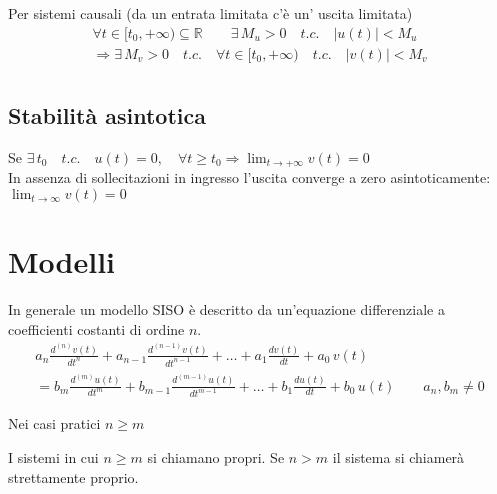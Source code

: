 	Per sistemi causali (da un entrata limitata c'è un' uscita limitata)
	\[
	\begin{split}
		\forall t \in [t_0, + \infty) \subseteq \mathbb{R} \qquad \exists \, M_u >0 \quad t.c. \quad \lvert u(t) \rvert < M_u \\
		\Rightarrow \exists \, M_v > 0 \quad t.c. \quad \forall t \in [t_0, + \infty) \quad t.c. \quad \lvert v(t) \rvert < M_v\\
	\end{split}		
	\]
	
\subsection{Stabilità asintotica}
	Se $\exists \, t_0 \quad t.c. \quad u(t)=0, \quad \forall t \ge t_0 \Rightarrow \lim_{t \to +\infty} v(t)=0$\\
	In assenza di sollecitazioni in ingresso l'uscita converge a zero asintoticamente: $\lim_{t \to \infty} v(t)=0$
	


	
\section{Modelli}

In generale un modello SISO è descritto da un'equazione differenziale a coefficienti costanti di ordine $n$.
\begin{multline}
	a_n \frac{d^{(n)} v(t)}{dt^n} 
		+ a_{n-1} \frac{d^{(n-1)} v(t)}{dt^{n-1}} 
		+ \dots 
		+ a_1 \frac{dv(t)}{dt} 
		+ a_0\,v(t)\\
	= b_m \frac{d^{(m)} u(t)}{dt^m}
		+ b_{m-1} \frac{d^{(m-1)} u(t)}{dt^{m-1}} 
		+ \dots
		+ b_1 \frac{du(t)}{dt} 
		+ b_0\,u(t) \qquad
	a_n, b_m \ne 0	
\tag{2}\label{equation 2}
\end{multline}

\begin{osservazione}
	Nei casi pratici $n \ge m$	
\end{osservazione}

\begin{definizione}
	I sistemi in cui $n \ge m$ si chiamano propri. Se $n > m$ il sistema si chiamerà strettamente proprio.
\end{definizione}

